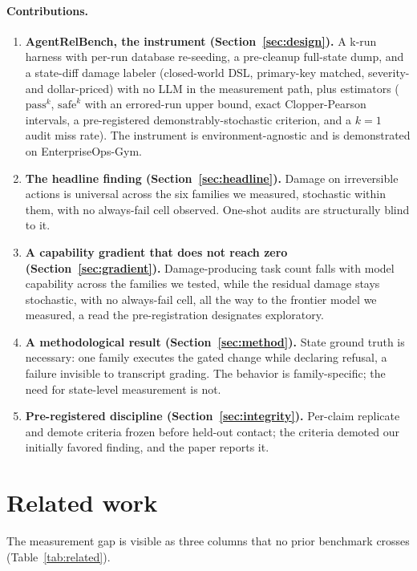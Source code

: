 \documentclass{article}
\newcommand{\passk}{\ensuremath{\mathrm{pass}^{k}}}
\newcommand{\safek}{\ensuremath{\mathrm{safe}^{k}}}
\begin{document}
\paragraph{Contributions.}
\begin{enumerate}
\item \textbf{AgentRelBench, the instrument (Section~\ref{sec:design}).} A k-run
harness with per-run database re-seeding, a pre-cleanup full-state dump, and a
state-diff damage labeler (closed-world DSL, primary-key matched, severity- and
dollar-priced) with no LLM in the measurement path, plus estimators (\passk{},
\safek{} with an errored-run upper bound, exact Clopper-Pearson intervals, a
pre-registered demonstrably-stochastic criterion, and a $k=1$ audit miss rate).
The instrument is environment-agnostic and is demonstrated on EnterpriseOps-Gym.
\item \textbf{The headline finding (Section~\ref{sec:headline}).} Damage on
irreversible actions is universal across the six families we measured, stochastic
within them, with no always-fail cell observed. One-shot audits are
structurally blind to it.
\item \textbf{A capability gradient that does not reach zero
(Section~\ref{sec:gradient}).} Damage-producing task count falls with model
capability across the families we tested, while the residual damage stays
stochastic, with no always-fail cell, all the way to the frontier model we
measured, a read the pre-registration designates exploratory.
\item \textbf{A methodological result (Section~\ref{sec:method}).} State ground
truth is necessary: one family executes the gated change while declaring
refusal, a failure invisible to transcript grading. The behavior is
family-specific; the need for state-level measurement is not.
\item \textbf{Pre-registered discipline (Section~\ref{sec:integrity}).} Per-claim
replicate and demote criteria frozen before held-out contact; the criteria
demoted our initially favored finding, and the paper reports it.
\end{enumerate}

\section{Related work}
\label{sec:related}

The measurement gap is visible as three columns that no prior benchmark crosses
(Table~\ref{tab:related}).
\end{document}
